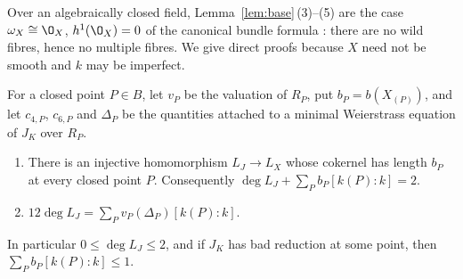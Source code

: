 Over an algebraically closed field, Lemma~\ref{lem:base}\,(3)--(5) are the case $\omega_X\cong\O_X$, $h^1(\O_X) = 0$ of the canonical bundle formula \cite[Theorem~2 and Proposition~4]{BM77}: there are no wild fibres, hence no multiple fibres.
We give direct proofs because $X$ need not be smooth and $k$ may be imperfect.

\medskip
For a closed point $P\in B$, let $v_P$ be the valuation of $R_P$, put $b_P = b(X_{(P)})$, and let $c_{4,P}$, $c_{6,P}$ and $\Delta_P$ be the quantities attached to a minimal Weierstrass equation of $J_K$ over $R_P$.

\begin{lemma}\label{lem:comparison}
\begin{enumerate}
\item There is an injective homomorphism $L_J\to L_X$ whose cokernel has length $b_P$ at every closed point $P$.
  Consequently $\deg L_J+\sum_Pb_P[k(P):k] = 2.$ \item $12\deg L_J = \sum_Pv_P(\Delta_P)[k(P):k]$.
\end{enumerate}
\noindent In particular $0\leq\deg L_J\leq 2$, and if $J_K$ has bad reduction at some point, then $\sum_Pb_P[k(P):k]\leq 1$.
\end{lemma}

